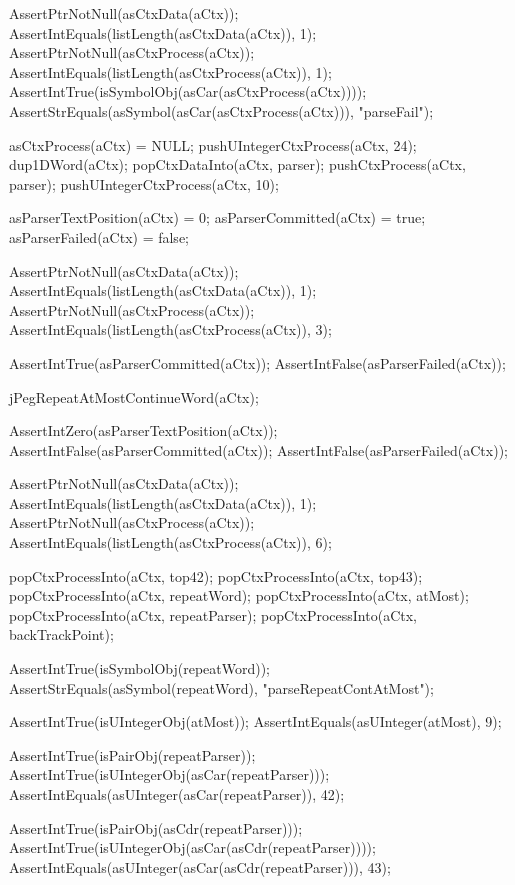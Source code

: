   AssertPtrNotNull(asCtxData(aCtx));
  AssertIntEquals(listLength(asCtxData(aCtx)), 1);
  AssertPtrNotNull(asCtxProcess(aCtx));
  AssertIntEquals(listLength(asCtxProcess(aCtx)), 1);
  AssertIntTrue(isSymbolObj(asCar(asCtxProcess(aCtx))));
  AssertStrEquals(asSymbol(asCar(asCtxProcess(aCtx))), "parseFail");
\stopCTest
\stopTestCase

\startCTest
  asCtxProcess(aCtx) = NULL;
  pushUIntegerCtxProcess(aCtx, 24);
  dup1DWord(aCtx);
  popCtxDataInto(aCtx, parser);
  pushCtxProcess(aCtx, parser);
  pushUIntegerCtxProcess(aCtx, 10);

  asParserTextPosition(aCtx) = 0;
  asParserCommitted(aCtx)    = true;
  asParserFailed(aCtx)       = false;
  
  AssertPtrNotNull(asCtxData(aCtx));
  AssertIntEquals(listLength(asCtxData(aCtx)), 1);
  AssertPtrNotNull(asCtxProcess(aCtx));
  AssertIntEquals(listLength(asCtxProcess(aCtx)), 3);
  
  AssertIntTrue(asParserCommitted(aCtx));
  AssertIntFalse(asParserFailed(aCtx));
  
  jPegRepeatAtMostContinueWord(aCtx);
  
  AssertIntZero(asParserTextPosition(aCtx));
  AssertIntFalse(asParserCommitted(aCtx));
  AssertIntFalse(asParserFailed(aCtx));
  
  AssertPtrNotNull(asCtxData(aCtx));
  AssertIntEquals(listLength(asCtxData(aCtx)), 1);
  AssertPtrNotNull(asCtxProcess(aCtx));
  AssertIntEquals(listLength(asCtxProcess(aCtx)), 6);
    
  popCtxProcessInto(aCtx, top42);
  popCtxProcessInto(aCtx, top43);
  popCtxProcessInto(aCtx, repeatWord);
  popCtxProcessInto(aCtx, atMost);
  popCtxProcessInto(aCtx, repeatParser);
  popCtxProcessInto(aCtx, backTrackPoint);
  
  AssertIntTrue(isSymbolObj(repeatWord));
  AssertStrEquals(asSymbol(repeatWord), "parseRepeatContAtMost");
  
  AssertIntTrue(isUIntegerObj(atMost));
  AssertIntEquals(asUInteger(atMost), 9);
  
  AssertIntTrue(isPairObj(repeatParser));
  AssertIntTrue(isUIntegerObj(asCar(repeatParser)));
  AssertIntEquals(asUInteger(asCar(repeatParser)), 42);
  
  AssertIntTrue(isPairObj(asCdr(repeatParser)));
  AssertIntTrue(isUIntegerObj(asCar(asCdr(repeatParser))));
  AssertIntEquals(asUInteger(asCar(asCdr(repeatParser))), 43);
  
